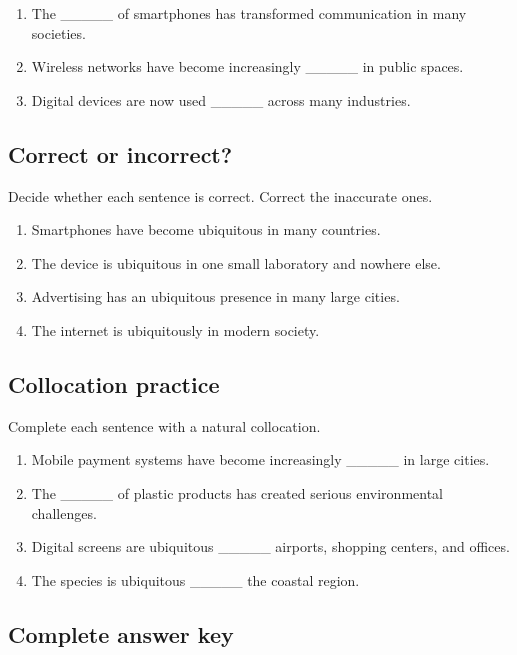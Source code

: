 \documentclass[11pt]{article}
\begin{document}
\begin{enumerate}
  \item The \_\_\_\_\_ of smartphones has transformed communication in many societies.
  \item Wireless networks have become increasingly \_\_\_\_\_ in public spaces.
  \item Digital devices are now used \_\_\_\_\_ across many industries.
\end{enumerate}

\subsection{Correct or incorrect?}
Decide whether each sentence is correct. Correct the inaccurate ones.

\begin{enumerate}
  \item Smartphones have become ubiquitous in many countries.
  \item The device is ubiquitous in one small laboratory and nowhere else.
  \item Advertising has an ubiquitous presence in many large cities.
  \item The internet is ubiquitously in modern society.
\end{enumerate}

\subsection{Collocation practice}
Complete each sentence with a natural collocation.

\begin{enumerate}
  \item Mobile payment systems have become increasingly \_\_\_\_\_ in large cities.
  \item The \_\_\_\_\_ of plastic products has created serious environmental challenges.
  \item Digital screens are ubiquitous \_\_\_\_\_ airports, shopping centers, and offices.
  \item The species is ubiquitous \_\_\_\_\_ the coastal region.
\end{enumerate}

\subsection{Complete answer key}
\end{document}
